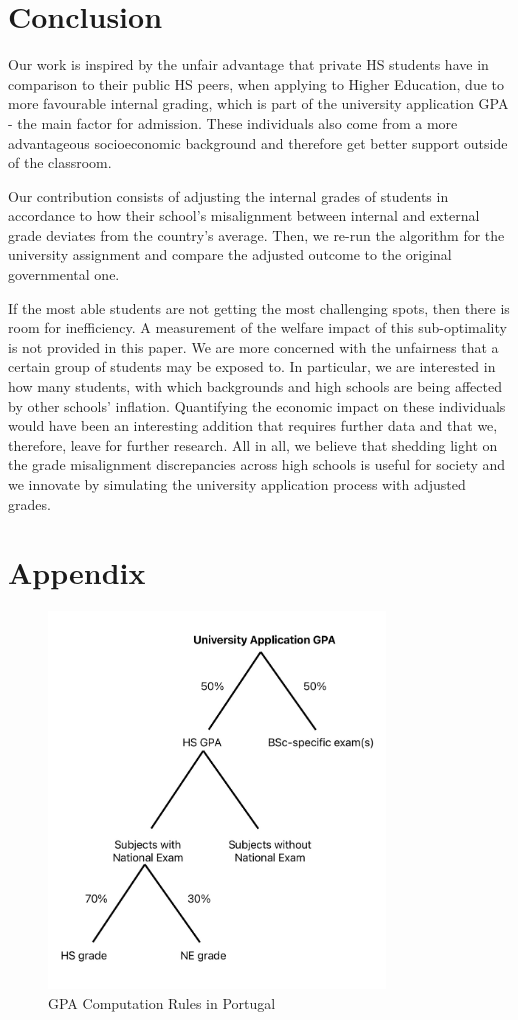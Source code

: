 \documentclass{article}
\begin{document}
\section{Conclusion}
Our work is inspired by the unfair advantage that private HS students have in comparison to their public HS peers, when applying to Higher Education, due to more favourable internal grading, which is part of the university application GPA - the main factor for admission. These individuals also come from a more advantageous socioeconomic background and therefore get better support outside of the classroom.

Our contribution consists of adjusting the internal grades of students in accordance to how their school's misalignment between internal and external grade deviates from the country's average. Then, we re-run the algorithm for the university assignment and compare the adjusted outcome to the original governmental one.

If the most able students are not getting the most challenging spots, then there is room for inefficiency. A measurement of the welfare impact of this sub-optimality is not provided in this paper. We are more concerned with the unfairness that a certain group of students may be exposed to. In particular, we are interested in how many students, with which backgrounds and high schools are being affected by other schools' inflation. Quantifying the economic impact on these individuals would have been an interesting addition that requires further data and that we, therefore, leave for further research. All in all, we believe that shedding light on the grade misalignment discrepancies across high schools is useful for society and we innovate by simulating the university application process with adjusted grades.




\newpage
\appendix
\section{Appendix}

\renewcommand{\thefigure}{A\arabic{figure}} %
\setcounter{figure}{0} %

\begin{figure}[ht]
  \centering
  \includegraphics[height=10cm, keepaspectratio]{Figures/GradeComputationPortugal.jpeg}
  \caption{GPA Computation Rules in Portugal}
  \label{fig: GradeComputationPortugal}
\end{figure}
\end{document}
